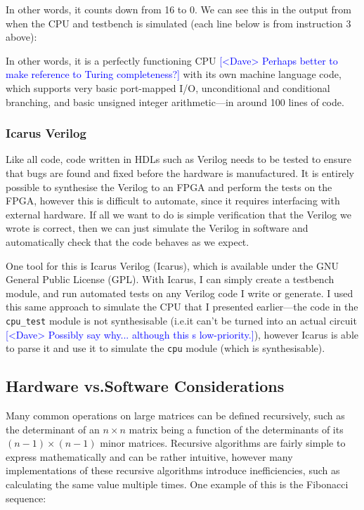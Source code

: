 \documentclass[12pt]{article}
\newcommand{\note}[2][red]{\textcolor{#1}{#2}}
\newcommand{\notedme}[1]{\note[blue]{[<Dave> #1]}}
\begin{document}
In other words, it counts down from 16 to 0. We can see this in the output from when the CPU and testbench is simulated (each line below is from instruction 3 above):



In other words, it is a perfectly functioning CPU \notedme{Perhaps better to make reference to Turing completeness?} with its own machine language code, which supports very basic port-mapped I/O, unconditional and conditional branching, and basic unsigned integer arithmetic---in around 100 lines of code.

\subsubsection{Icarus Verilog}

Like all code, code written in HDLs such as Verilog needs to be tested to ensure that bugs are found and fixed before the hardware is manufactured. It is entirely possible to synthesise the Verilog to an FPGA and perform the tests on the FPGA, however this is difficult to automate, since it requires interfacing with external hardware. If all we want to do is simple verification that the Verilog we wrote is correct, then we can just simulate the Verilog in software and automatically check that the code behaves as we expect.

One tool for this is Icarus Verilog (Icarus), which is available under the GNU General Public License (GPL). With Icarus, I can simply create a testbench module, and run automated tests on any Verilog code I write or generate. I used this same approach to simulate the CPU that I presented earlier---the code in the \lstinline[language=Verilog]|cpu_test| module is not synthesisable (i.e.\@ it can't be turned into an actual circuit \notedme{Possibly say why... although this s low-priority.}), however Icarus is able to parse it and use it to simulate the \lstinline[language=Verilog]|cpu| module (which is synthesisable).

\subsection{Hardware vs.\@ Software Considerations}

Many common operations on large matrices can be defined recursively, such as the determinant of an $n \times n$ matrix being a function of the determinants of its $(n-1) \times (n-1)$ minor matrices. Recursive algorithms are fairly simple to express mathematically and can be rather intuitive, however many implementations of these recursive algorithms introduce inefficiencies, such as calculating the same value multiple times. One example of this is the Fibonacci sequence:
\end{document}
